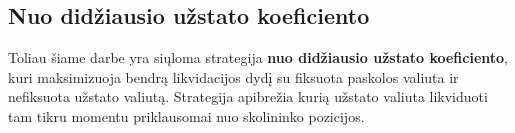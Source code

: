 \documentclass[]{VUMIFTemplateClass}
\begin{document}
    



\subsection{Nuo didžiausio užstato koeficiento}

Toliau šiame darbe yra siųloma strategija \textbf{nuo didžiausio užstato koeficiento}, kuri maksimizuoja bendrą likvidacijos dydį su fiksuota paskolos valiuta ir nefiksuota užstato valiutą. Strategija apibrežia kurią užstato valiuta likviduoti tam tikru momentu priklausomai nuo skolininko pozicijos.
\end{document}
